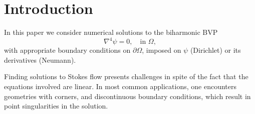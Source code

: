 
\section{Introduction}

In this paper we consider numerical solutions to the biharmonic BVP
\begin{equation} \label{eq:bvp}
\nabla^4 \psi = 0, \quad \text{in }\Omega,
\end{equation}
with appropriate boundary conditions on $\partial\Omega$, imposed on $\psi$ (Dirichlet) or its derivatives (Neumann).


Finding solutions to Stokes flow presents challenges in spite of the fact that the equations involved are linear. In most common applications, one encounters geometries with corners, and discontinuous boundary conditions, which result in point singularities in the solution. 


\endinput
\begin{itemize}
\item Discuss regularity in the physical variables $u,v,p,\omega,\psi$. 
\item We have harmonic functions $p,\omega$, which belong to $H^0(\Omega)$
\item We also have biharmonic functions $\psi,u,v$, which belong to $H^2(\Omega)$
\end{itemize}